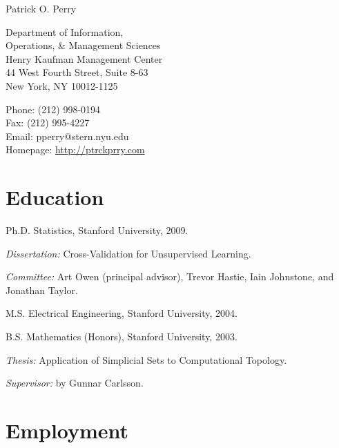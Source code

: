 \documentclass[10pt,letterpaper]{article}
\def\name{Patrick O. Perry}
\renewenvironment{itemize}{
  \begin{list}{}{
    \setlength{\leftmargin}{1.5em}
    \setlength{\itemsep}{0.25em}
    \setlength{\parskip}{0pt}
    \setlength{\parsep}{0.25em}
  }
}{
  \end{list}
}
\begin{document}
{\huge \name}


\bigskip

\begin{minipage}[t]{0.5\textwidth}
  Department of Information, \\
  Operations, \& Management Sciences \\
  Henry Kaufman Management Center \\
  44 West Fourth Street, Suite 8-63 \\
  New York, NY 10012-1125
\end{minipage}
\begin{minipage}[t]{0.5\textwidth}
  Phone: (212) 998-0194 \\
  Fax: (212) 995-4227 \\
  Email: pperry@stern.nyu.edu \\
  Homepage: \href{http://ptrckprry.com/}{http://ptrckprry.com}
\end{minipage}

\section*{Education}

\begin{itemize}
  \item Ph.D. Statistics, Stanford University, 2009.
    \begin{itemize}
    \item \textit{Dissertation:}
      Cross-Validation for Unsupervised Learning.
    \item \textit{Committee:}
      Art Owen (principal advisor), Trevor Hastie,
      Iain Johnstone, and Jonathan Taylor.
    \end{itemize}
  \item M.S. Electrical Engineering, Stanford University, 2004.
  \item B.S. Mathematics (Honors),
    Stanford University, 2003.
    \begin{itemize}
    \item \textit{Thesis:}
      Application of Simplicial Sets to Computational Topology.
    \item \textit{Supervisor:} by Gunnar Carlsson.
    \end{itemize}
\end{itemize}

\section*{Employment}
\end{document}
